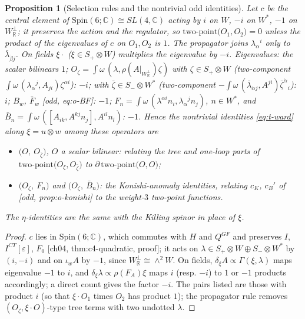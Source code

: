 \documentclass[11pt]{report}
\theoremstyle{plain}
\newtheorem{proposition}[theorem]{Proposition}
\theoremstyle{definition}
\numberwithin{equation}{chapter}
\newcommand{\Wp}{W_{\mathbb R}^\perp}
\newcommand{\TP}[2]{\mathrm{two\mbox{-}point}\big(#1,#2\big)}
\begin{document}
\begin{proposition}[Selection rules and the nontrivial odd identities]
\label{prop:t-select}
Let $c$ be the central element of $\mathrm{Spin}(6;\mathbb C)\cong SL(4,\mathbb C)$ acting by $i$ on $W$, $-i$ on $W^*$, $-1$ on $\Wp$; it preserves the action and the regulator, so $\TP{O_1}{O_2}=0$ unless the product of the eigenvalues of $c$ on $O_1,O_2$ is $1$. The propagator joins $\lambda_\alpha{}^i$ only to $\bar\lambda_{\dot\beta j}$. On fields $\xi\cdot$ ($\xi\in S_+\otimes W$) multiplies the eigenvalue by $-i$. Eigenvalues: the scalar bilinears $1$; $O_\zeta=\int\omega\,(\lambda,\rho(A|_{\Wp})\zeta)$ with $\zeta\in S_+\otimes W$ (two-component $\int\omega\,(\lambda_\alpha{}^j,A_{ji})\zeta^{\alpha i}$): $-i$; with $\bar\zeta\in S_-\otimes W^*$ (two-component $-\int\omega\,(\bar\lambda_{\dot\alpha j},A^{ji})\bar\zeta^{\dot\alpha}{}_i$): $i$; $B_w$, $\bar F_w$ [odd, eq:o-BF]: $-1$; $F_n=\int\omega\,(\lambda^{\alpha i}n_i,\lambda_\alpha{}^jn_j)$, $n\in W^*$, and $\bar B_n=\int\omega\,([A_{ik},A^{kj}n_j],A^{il}n_l)$: $-1$. Hence the nontrivial identities \eqref{eq:t-ward} along $\xi=u\otimes w$ among these operators are
\begin{itemize}
\item[(a)] $\big(O,\ O_{\bar\zeta}\big)$, $O$ a scalar bilinear: relating the tree and one-loop parts of $\TP{O_{\xi}}{O_{\bar\zeta}}$ to $\partial\,\TP{O}{O}$;
\item[(b)] $\big(O_\zeta,\ F_n\big)$ and $\big(O_\zeta,\ \bar B_n\big)$: the Konishi-anomaly identities, relating $c_K$, $c_B'$ of [odd, prop:o-konishi] to the weight-$3$ two-point functions.
\end{itemize}
The $\eta$-identities are the same with the Killing spinor in place of $\xi$.
\end{proposition}

\begin{proof}
$c$ lies in $\mathrm{Spin}(6;\mathbb C)$, which commutes with $H$ and $Q^{GF}$ and preserves $I$, $I^{CT}[\varepsilon]$, $F_0$ [ch04, thm:c4-quadratic, proof]; it acts on $\lambda\in S_+\otimes W\oplus S_-\otimes W^*$ by $(i,-i)$ and on $\iota_wA$ by $-1$, since $\Wp\cong\wedge^2W$. On fields, $\delta_\xi A\propto\Gamma(\xi,\lambda)$ maps eigenvalue $-1$ to $i$, and $\delta_\xi\lambda\propto\rho(F_A)\xi$ maps $i$ (resp. $-i$) to $1$ or $-1$ products accordingly; a direct count gives the factor $-i$. The pairs listed are those with product $i$ (so that $\xi\cdot O_1$ times $O_2$ has product $1$); the propagator rule removes $(O_\zeta,\xi\cdot O)$-type tree terms with two undotted $\lambda$.
\end{proof}
\end{document}
